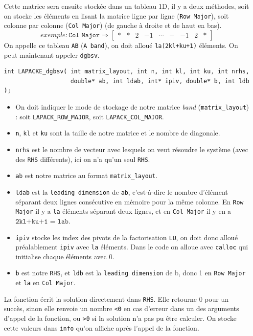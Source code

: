 \documentclass{article}
\begin{document}
Cette matrice sera ensuite stockée dans un tableau 1D, il y a deux méthodes, soit on stocke les éléments en lisant la matrice ligne par ligne (\texttt{Row Major}), soit colonne par colonne (\texttt{Col Major}) (de gauche à droite et de haut en bas).
\[ 
	exemple : \texttt{Col Major} \Longrightarrow
	\begin{bmatrix}
	\ast & \ast	& 2 & -1 & \cdots & \texttt{+} & -1 & 2 & \ast
	\end{bmatrix}
\]
On appelle ce tableau \texttt{AB} (\texttt{A band}), on doit alloué \texttt{la(2kl+ku+1)} éléments.
On peut maintenant appeler \texttt{dgbsv}.
\begin{scriptsize}
\begin{verbatim}
int LAPACKE_dgbsv( int matrix_layout, int n, int kl, int ku, int nrhs, 
                   double* ab, int ldab, int* ipiv, double* b, int ldb );
\end{verbatim}
\end{scriptsize}
\begin{itemize}
\item On doit indiquer le mode de stockage de notre matrice \textit{band} (\texttt{matrix\_layout}) : soit \texttt{LAPACK\_ROW\_MAJOR}, soit \texttt{LAPACK\_COL\_MAJOR}.
\item \texttt{n}, \texttt{kl} et \texttt{ku} sont la taille de notre matrice et le nombre de diagonale.
\item \texttt{nrhs} est le nombre de vecteur avec lesquels on veut résoudre le système (avec des \texttt{RHS} différents), ici on n'a qu'un seul \texttt{RHS}.
\item \texttt{ab} est notre matrice au format \texttt{matrix\_layout}.
\item \texttt{ldab} est la \texttt{leading dimension} de \texttt{ab}, c'est-à-dire le nombre d'élément  séparant deux lignes consécutive en mémoire pour la même colonne. En \texttt{Row Major} il y a \texttt{la} éléments séparant deux lignes, et en \texttt{Col Major} il y en a $\texttt{2kl+ku+1 = lab}$.
\item \texttt{ipiv} stocke les index des pivots de la factorisation \texttt{LU}, on doit donc alloué préalablement \texttt{ipiv} avec \texttt{la} éléments. Dans le code on alloue avec \texttt{calloc} qui initialise chaque éléments avec 0.
\item \texttt{b} est notre \texttt{RHS}, et \texttt{ldb} est la \texttt{leading dimension} de b, donc 1 en \texttt{Row Major} et \texttt{la} en \texttt{Col Major}.
\end{itemize}
La fonction écrit la solution directement dans \texttt{RHS}.
Elle retourne 0 pour un succès, sinon elle renvoie un nombre \texttt{<0} en cas d'erreur dans un des arguments d'appel de la fonction, ou \texttt{>0} si la solution n'a pas pu être calculer. On stocke cette valeurs dans \texttt{info} qu'on affiche après l'appel de la fonction.
\end{document}

